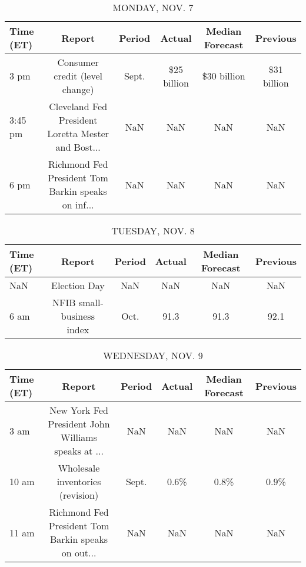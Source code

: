 \documentclass{article}%
\begin{document}
%
\normalsize%


\begin{table}[htbp]%
\caption{MONDAY, NOV. 7}%
\centering%
\begin{adjustbox}{width=1\textwidth}%
\begin{tabular}{lccccc}
\toprule
Time (ET) &                                             Report & Period &      Actual & Median Forecast &    Previous \\
\midrule
     3 pm &                     Consumer credit (level change) &  Sept. & \$25 billion &     \$30 billion & \$31 billion \\
  3:45 pm & Cleveland Fed President Loretta Mester and Bost... &    NaN &         NaN &             NaN &         NaN \\
     6 pm & Richmond Fed President Tom Barkin speaks on inf... &    NaN &         NaN &             NaN &         NaN \\
\bottomrule
\end{tabular}
%
\end{adjustbox}%
\end{table}

%


\begin{table}[htbp]%
\caption{TUESDAY, NOV. 8}%
\centering%
\begin{adjustbox}{width=1\textwidth}%
\begin{tabular}{lccccc}
\toprule
Time (ET) &                    Report & Period & Actual & Median Forecast & Previous \\
\midrule
      NaN &              Election Day &    NaN &    NaN &             NaN &      NaN \\
     6 am & NFIB small-business index &   Oct. &   91.3 &            91.3 &     92.1 \\
\bottomrule
\end{tabular}
%
\end{adjustbox}%
\end{table}

%


\begin{table}[htbp]%
\caption{WEDNESDAY, NOV. 9}%
\centering%
\begin{adjustbox}{width=1\textwidth}%
\begin{tabular}{lccccc}
\toprule
Time (ET) &                                             Report & Period & Actual & Median Forecast & Previous \\
\midrule
     3 am & New York Fed President John Williams speaks at ... &    NaN &    NaN &             NaN &      NaN \\
    10 am &                   Wholesale inventories (revision) &  Sept. &   0.6\% &            0.8\% &     0.9\% \\
    11 am & Richmond Fed President Tom Barkin speaks on out... &    NaN &    NaN &             NaN &      NaN \\
\bottomrule
\end{tabular}
%
\end{adjustbox}%
\end{table}
\end{document}
